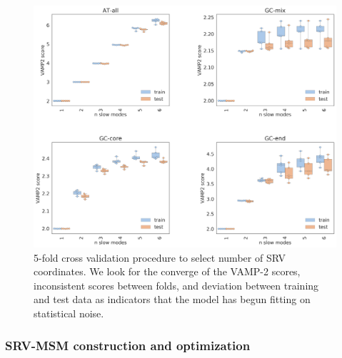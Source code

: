 \documentclass[journal=jpcbfk,manuscript=article]{achemso}
\begin{document}
\begin{figure}[ht!]
	\begin{center}
        \includegraphics[width=120mm, 
        scale=0.5]{Figs/figs_0804/allseq_cross_val_scores_lag-40.png}
        \caption{5-fold cross validation procedure to select number of SRV coordinates. We look for the converge of the VAMP-2 scores, inconsistent scores between folds, and deviation between training and test data as indicators that the model has begun fitting on statistical noise.}
        \label{fig:allseq_srv_crossval}
	\end{center}
\end{figure}


\subsubsection{SRV-MSM construction and optimization}
\end{document}
